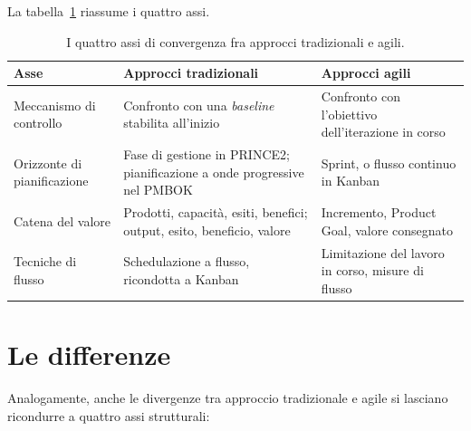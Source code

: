 La tabella~\ref{tab:affinita} riassume i quattro assi.
\begin{table}[htbp]
\centering
\small
\caption{I quattro assi di convergenza fra approcci tradizionali e agili.}
\label{tab:affinita}
\begin{tabularx}{\textwidth}{@{}>{\raggedright\arraybackslash}p{2.9cm}XX@{}}
\toprule
\textbf{Asse} & \textbf{Approcci tradizionali} & \textbf{Approcci agili} \\
\midrule
Meccanismo di controllo &
Confronto con una \emph{baseline} stabilita all'inizio &
Confronto con l'obiettivo dell'iterazione in corso \\
\addlinespace
Orizzonte di pianificazione &
Fase di gestione in PRINCE2; pianificazione a onde progressive nel PMBOK &
Sprint, o flusso continuo in Kanban \\
\addlinespace
Catena del valore &
Prodotti, capacit\`a, esiti, benefici; output, esito, beneficio, valore &
Incremento, Product Goal, valore consegnato \\
\addlinespace
Tecniche di flusso &
Schedulazione a flusso, ricondotta a Kanban &
Limitazione del lavoro in corso, misure di flusso \\
\bottomrule
\end{tabularx}
\end{table}





\section{Le differenze}

Analogamente, anche le divergenze tra approccio tradizionale e agile si lasciano
ricondurre a quattro assi strutturali:

